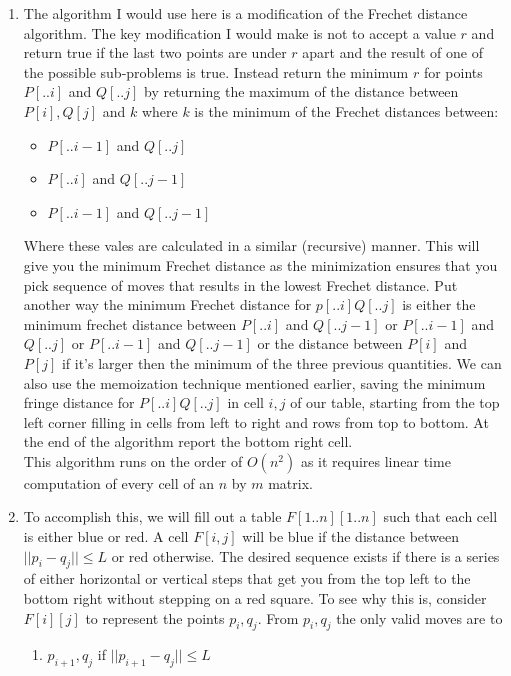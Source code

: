 \documentclass[11pt]{article}
\begin{document}
\begin{enumerate}
		\item
			The algorithm I would use here is a modification of the
			Frechet distance algorithm. The key modification I would
			make is not to accept a value $r$ and return
			true if the last two points are under $r$ apart
			and the result of one of the possible sub-problems is
			true.
			Instead return the minimum $r$ 
			for points $P[..i]$ and $Q[..j]$ by returning the maximum of
			the distance between $P[i],Q[j]$ and $k$ where
			$k$ is the minimum of the Frechet distances between:
			\begin{itemize}
			\item $P[..i-1]$ and $Q[..j]$
			\item $P[..i]$ and $Q[..j-1]$
			\item $P[..i-1]$ and $Q[..j-1]$
			\end{itemize}
			Where these vales are calculated in a similar (recursive)
			manner. This will give you the minimum
			Frechet distance as the minimization ensures that you
			pick sequence of moves that results in the lowest 
			Frechet distance. Put another way the minimum Frechet
			distance for $p[..i]Q[..j]$ is either the minimum
			frechet distance between
			$P[..i]$ and $Q[..j-1]$ or
			$P[..i-1]$ and $Q[..j]$ or
			$P[..i-1]$ and $Q[..j-1]$ 
			or the distance between $P[i]$ and $P[j]$ if it's larger
			then the minimum of the three previous quantities. We
			can also use the memoization technique mentioned earlier,
			saving the minimum fringe distance for 
			 $P[..i]Q[..j]$ in cell $i,j$ of our table, starting
			 from the top left corner filling in
			 cells from left to right and rows from top to bottom.
			 At the end of the algorithm report the bottom right
			 cell.\\
			 This algorithm runs on the order of $O(n^2)$ as it
			 requires linear time computation of every cell of an
			 $n$ by $m$ matrix.
		\item 
			To accomplish this, we will fill out a table $F[1..n][1..n]$
		 such that each cell is either blue or
			red. A cell $F[i,j]$ will be blue if the
			distance between $||p_i - q_j|| \leq L$ or red
			otherwise. The desired sequence exists if there is a
			series of either horizontal or vertical steps that get
			you from the top left to the bottom right without
			stepping on a red square. To see why this is, consider
			$F[i][j]$ to represent the points $p_i,q_j$. From
			$p_i,q_j$ the only valid moves are to
			\begin{enumerate}
			\item $p_{i+1},q_{j}$ if $|| p_{i+1} - q_{j}|| \leq L$

\end{enumerate}
\end{enumerate}
\end{document}
